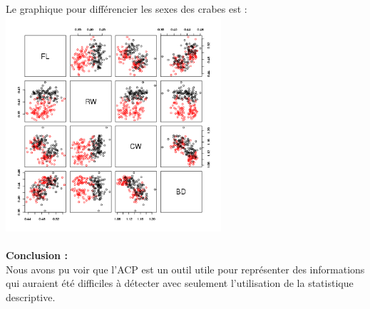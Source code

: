 \documentclass[a4paper, 10pt]{article}
\begin{document}
Le graphique pour diff\'erencier les sexes des crabes est :\\
\includegraphics[height = 8cm, width = 8cm]{plots/plot_crabs_sex_2.png}\\ \\
\textbf{Conclusion :}\\
Nous avons pu voir que l'ACP est un outil utile pour repr\'esenter des informations qui auraient \'et\'e difficiles \`a d\'etecter avec
seulement l'utilisation de la statistique descriptive.
\end{document}
